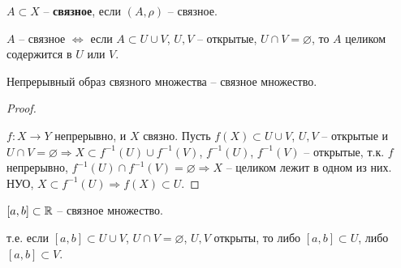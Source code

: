 \begin{conj}
    $A \subset X$ -- \textbf{связное}, если $(A, \rho)$ -- связное.
\end{conj}

\notice $A$ -- связное $\Longleftrightarrow$ если $A \subset U \cup V$,
$U, V$ -- открытые, $U \cap V = \varnothing$, то $A$ целиком содержится
в $U$ или $V$.

\begin{theorem-non}
    Непрерывный образ связного множества -- связное множество.
\end{theorem-non}
\begin{proof} $ $

    $f: X \rightarrow Y$ непрерывно, и $X$ связно. Пусть $f(X) \subset
    U \cup V$, $U, V$ -- открытые и $U \cap V = \varnothing \Rightarrow
    X \subset f^{-1}(U) \cup f^{-1}(V)$, $f^{-1}(U)$, $f^{-1}(V)$ --
    открытые, т.к. $f$ непрерывно, $f^{-1}(U) \cap f^{-1}(V) =
    \varnothing \Rightarrow X$ -- целиком лежит в одном из них.
    НУО, $X \subset f^{-1}(U) \Rightarrow f(X) \subset U$.
\end{proof}

\begin{theorem-non}
$[a, b] \subset \mathbb{R}$ -- связное множество.
\end{theorem-non}
т.е. если $[a, b] \subset U \cup V$, $U \cap V = \varnothing$, $U, V$
открыты, то либо $[a, b] \subset U$, либо $[a, b] \subset V$.

